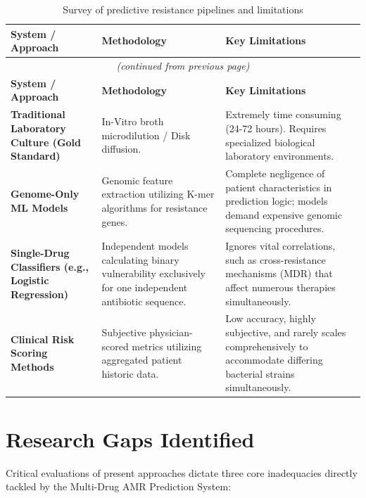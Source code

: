 \documentclass[12pt,a4paper]{report}
\begin{document}
\begin{longtable}{@{}p{3.2cm}p{4.0cm}p{6.4cm}@{}}
\toprule
\textbf{System / Approach} & \textbf{Methodology} & \textbf{Key Limitations} \\
\midrule
\endfirsthead
\multicolumn{3}{c}{\small\textit{(continued from previous page)}}\\
\toprule
\textbf{System / Approach} & \textbf{Methodology} & \textbf{Key Limitations} \\
\midrule
\endhead
\bottomrule
\caption{Survey of predictive resistance pipelines and limitations}
\label{tab:related_works}
\endlastfoot
\bottomrule
\endfoot

\textbf{Traditional Laboratory Culture (Gold Standard)} &
In-Vitro broth microdilution / Disk diffusion. &
Extremely time consuming (24-72 hours). Requires specialized biological laboratory environments. \\[0.4em]

\textbf{Genome-Only ML Models} &
Genomic feature extraction utilizing K-mer algorithms for resistance genes. &
Complete negligence of patient characteristics in prediction logic; models demand expensive genomic sequencing procedures. \\[0.4em]

\textbf{Single-Drug Classifiers (e.g., Logistic Regression)} &
Independent models calculating binary vulnerability exclusively for one independent antibiotic sequence. &
Ignores vital correlations, such as cross-resistance mechanisms (MDR) that affect numerous therapies simultaneously. \\[0.4em]

\textbf{Clinical Risk Scoring Methods} &
Subjective physician-scored metrics utilizing aggregated patient historic data. &
Low accuracy, highly subjective, and rarely scales comprehensively to accommodate differing bacterial strains simultaneously. \\[0.4em]

\end{longtable}

\section{Research Gaps Identified}

Critical evaluations of present approaches dictate three core inadequacies directly tackled by the Multi-Drug AMR Prediction System:
\end{document}
